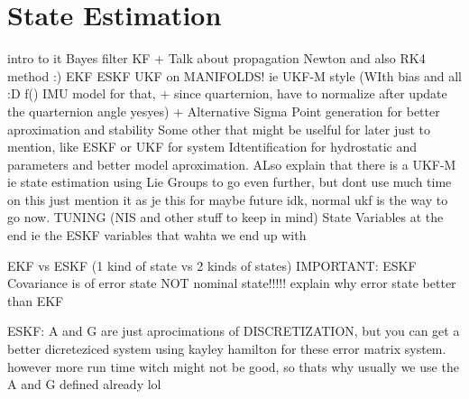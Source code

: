 \section{State Estimation}

intro to it
Bayes filter
KF + Talk about propagation Newton and also RK4 method :)
EKF
ESKF
UKF on MANIFOLDS! ie UKF-M style (WIth bias and all :D f() IMU model for that, + since quarternion, have to normalize after update the quarternion angle yesyes) + Alternative Sigma Point generation for better aproximation and stability
Some other that might be uselful for later just to mention, like ESKF or UKF for system Idtentification for hydrostatic and parameters and better model aproximation. ALso explain that there is a UKF-M ie state estimation using Lie Groups to go even further, but dont use much time on this just mention it as je this for maybe future idk, normal ukf is the way to go now.
TUNING (NIS and other stuff to keep in mind)
State Variables at the end ie the ESKF variables that wahta we end up with


EKF vs ESKF (1 kind of state vs 2 kinds of states)
IMPORTANT: ESKF Covariance is of error state NOT nominal state!!!!!
explain why error state better than EKF


ESKF:
A and G are just aprocimations of DISCRETIZATION, but you can get a better dicreteziced system using kayley hamilton for these error matrix system. however more run time witch might not be good, so thats why usually we use the A and G defined already lol



